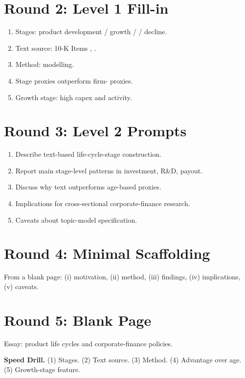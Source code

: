 \documentclass[11pt]{article}
\newcommand{\blank}[1]{\underline{\hspace{#1}}}
\begin{document}
\section*{Round 2: Level 1 Fill-in}
\begin{enumerate}
\item Stages: product development / growth / \blank{2cm} / decline.
\item Text source: 10-K Items \blank{1cm}, \blank{1cm}.
\item Method: \blank{2cm} modelling.
\item Stage proxies outperform firm-\blank{1cm} proxies.
\item Growth stage: high capex and \blank{2cm} activity.
\end{enumerate}

\section*{Round 3: Level 2 Prompts}
\begin{enumerate}
\item Describe text-based life-cycle-stage construction.
\item Report main stage-level patterns in investment, R\&D, payout.
\item Discuss why text outperforms age-based proxies.
\item Implications for cross-sectional corporate-finance research.
\item Caveats about topic-model specification.
\end{enumerate}

\section*{Round 4: Minimal Scaffolding}
From a blank page: (i) motivation, (ii) method, (iii) findings, (iv) implications, (v) caveats.

\section*{Round 5: Blank Page}
Essay: product life cycles and corporate-finance policies.

\vspace{6pt}
\begin{drillbox}
\textbf{Speed Drill.} (1) Stages. (2) Text source. (3) Method. (4) Advantage over age. (5) Growth-stage feature.
\end{drillbox}
\end{document}

